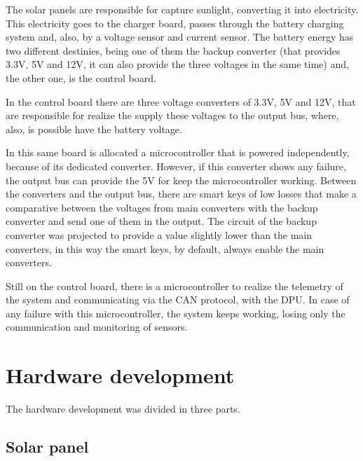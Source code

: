 \documentclass[3p]{elsarticle}
\begin{document}
	
	The solar panels are responsible for capture sunlight, converting it into electricity. This electricity goes to the charger board, passes through the battery charging system and, also, by a voltage sensor and current sensor. The battery energy has two different destinies, being one of them the backup converter (that provides 3.3V, 5V and 12V, it can also provide the three voltages in the same time) and, the other one, is the control board. 
	
	In the control board there are three voltage converters of 3.3V, 5V and 12V, that are responsible for realize the supply these voltages to the output bus, where, also, is possible have the battery voltage. 
	
	In this same board is allocated a microcontroller that is powered independently, because of its dedicated converter.  However, if this converter shows any failure, the output bus can provide the 5V for keep the microcontroller working. Between the converters and the output bus, there are smart keys of low losses that make a comparative between the voltages from main converters with the backup converter and send one of them in the output. The circuit of the backup converter was projected to provide a value slightly lower than the main converters, in this way the smart keys, by default, always enable the main converters.
	
	Still on the control board, there is a microcontroller to realize the telemetry of the system and communicating via the CAN protocol, with the DPU. In case of any failure with this microcontroller, the system keeps working, losing only the communication and monitoring of sensors.
	
\section{Hardware development}
\label{Hardware development}	

	The hardware development was divided in three parts.

\subsection{\textbf{Solar panel}}
\label{Solar panel}
\end{document}
